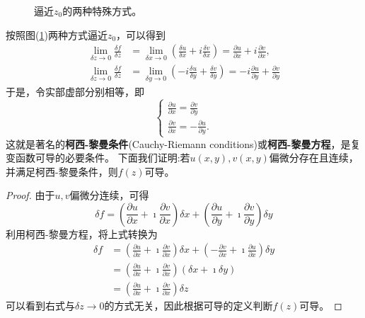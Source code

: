 \begin{figure}
    \centering
    
    \caption{逼近$z_0$的两种特殊方式。}
    \label{fig:limits}
\end{figure}
按照图(\ref{fig:limits})两种方式逼近$z_0$，可以得到
\begin{align}
    \lim _{\delta z \rightarrow 0} \frac{\delta f}{\delta z} &=\lim _{\delta x \rightarrow 0}\left(\frac{\delta u}{\delta x}+i \frac{\delta v}{\delta x}\right)=\frac{\partial u}{\partial x}+i \frac{\partial v}{\partial x},
\\
    \lim _{\delta z \rightarrow 0} \frac{\delta f}{\delta z} &=\lim _{\delta y \rightarrow 0}\left(-i \frac{\delta u}{\delta y}+\frac{\delta v}{\delta y}\right)=-i \frac{\partial u}{\partial y}+\frac{\partial v}{\partial y}
\end{align}
于是，令实部虚部分别相等，即
\begin{equation}
    \begin{cases}
        \frac{\partial u}{\partial x}=\frac{\partial v}{\partial y} \\
        \frac{\partial v}{\partial x}=-\frac{\partial u}{\partial y} .
    \end{cases}
\end{equation}
这就是著名的{\bf 柯西-黎曼条件}(Cauchy-Riemann conditions)或{\bf 柯西-黎曼方程}，是复变函数可导的必要条件。
下面我们证明:若$u(x,y), v(x,y)$偏微分存在且连续，并满足柯西-黎曼条件，则$f(z)$可导。
\begin{proof}
    由于$u,v$偏微分连续，可得
    \begin{equation*}
        \delta f=\left(\frac{\partial u}{\partial x}+\imath \frac{\partial v}{\partial x}\right) \delta x+\left(\frac{\partial u}{\partial y}+ \imath \frac{\partial v}{\partial y}\right) \delta y
    \end{equation*}
    利用柯西-黎曼方程，将上式转换为
    \begin{equation*}
        \begin{aligned}
        \delta f & =\left(\frac{\partial u}{\partial x}+ \imath \frac{\partial v}{\partial x}\right) \delta x+\left(-\frac{\partial v}{\partial x}+ \imath\frac{\partial u}{\partial x}\right) \delta y \\
        & =\left(\frac{\partial u}{\partial x}+ \imath \frac{\partial v}{\partial x}\right)(\delta x+ \imath \delta y) 
        \\
        & = \left(\frac{\partial u}{\partial x}+ \imath \frac{\partial v}{\partial x}\right) \delta z
        \end{aligned}
    \end{equation*}
可以看到右式与$\delta z\to 0$的方式无关，因此根据可导的定义判断$f(z)$可导。
\end{proof}
